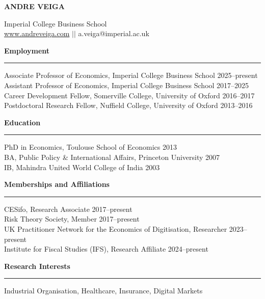 \documentclass[11pt,a4paper]{article}
\newcommand{\name}[1]{%
  \begin{center}
    {\Large\bfseries #1}
  \end{center}
  \vspace{-0.8em}
}
\newenvironment{rSection}[1]{%
  \vspace{0.5em}%
  \noindent\textbf{\large #1}%
  \vspace{0.3em}\par
  \hrule
  \vspace{0.5em}
}{%
  \vspace{0.8em}
}
\begin{document}
\name{ANDRE VEIGA}

\begin{center}
\vspace{-1em}
Imperial College Business School  \\ 
\href{http://www.andreveiga.com}{www.andreveiga.com} 
\quad $||$ \quad 
a.veiga@imperial.ac.uk 
\vspace{0.5em}
\end{center}

\begin{rSection}{Employment}
Associate Professor of Economics, Imperial College Business School \hfill 2025--present \\ 
Assistant Professor of Economics, Imperial College Business School \hfill 2017--2025 \\
Career Development Fellow, Somerville College, University of Oxford \hfill 2016--2017 \\ 
Postdoctoral Research Fellow, Nuffield College, University of Oxford \hfill 2013--2016
\end{rSection}

\begin{rSection}{Education}
PhD in Economics, Toulouse School of Economics \hfill 2013 \\ 
BA, Public Policy \& International Affairs, Princeton University \hfill 2007 \\
IB, Mahindra United World College of India \hfill 2003
\end{rSection}

\begin{rSection}{Memberships and Affiliations}
CESifo, Research Associate \hfill 2017--present \\ 
Risk Theory Society, Member \hfill 2017--present \\ 
UK Practitioner Network for the Economics of Digitisation, Researcher \hfill 2023--present \\ 
Institute for Fiscal Studies (IFS), Research Affiliate \hfill 2024--present
\end{rSection}

\begin{rSection}{Research Interests}
Industrial Organisation, Healthcare, Insurance, Digital Markets
\end{rSection}
\end{document}
